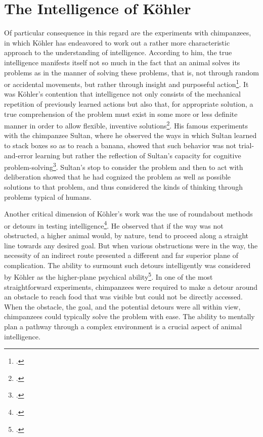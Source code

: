 \documentclass[12pt]{article}
\begin{document}
\section{The Intelligence of Köhler}

Of particular consequence in this regard are the experiments with chimpanzees, in which Köhler has endeavored to work out a rather more characteristic approach to the understanding of intelligence. According to him, the true intelligence manifests itself not so much in the fact that an animal solves its problems as in the manner of solving these problems, that is, not through random or accidental movements, but rather through insight and purposeful action\footcite{koehler1917chimpanzees}. It was Köhler's contention that intelligence not only consists of the mechanical repetition of previously learned actions but also that, for appropriate solution, a true comprehension of the problem must exist in some more or less definite manner in order to allow flexible, inventive solutions\footcite{koehler1921mentality}. His famous experiments with the chimpanzee Sultan, where he observed the ways in which Sultan learned to stack boxes so as to reach a banana, showed that such behavior was not trial-and-error learning but rather the reflection of Sultan's capacity for cognitive problem-solving\footcite{koehler1921mentality}. Sultan's stop to consider the problem and then to act with deliberation showed that he had cognized the problem as well as possible solutions to that problem, and thus considered the kinds of thinking through problems typical of humans.

Another critical dimension of Köhler's work was the use of roundabout methods or detours in testing intelligence\footcite{koehler1927detours}. He observed that if the way was not obstructed, a higher animal would, by nature, tend to proceed along a straight line towards any desired goal. But when various obstructions were in the way, the necessity of an indirect route presented a different and far superior plane of complication. The ability to surmount such detours intelligently was considered by Köhler as the higher-plane psychical ability\footcite{thorndike1898animal}. In one of the most straightforward experiments, chimpanzees were required to make a detour around an obstacle to reach food that was visible but could not be directly accessed. When the obstacle, the goal, and the potential detours were all within view, chimpanzees could typically solve the problem with ease. The ability to mentally plan a pathway through a complex environment is a crucial aspect of animal intelligence.
\end{document}
